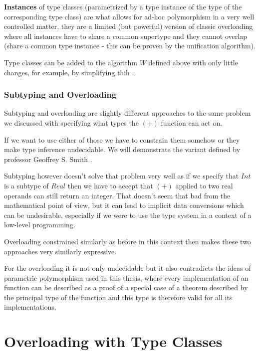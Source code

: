 \textbf{Instances} of type classes (parametrized by a type instance of the type of the corresponding type class) are what allows for ad-hoc polymorphism %
in a very well controlled matter, they are a limited (but powerful) version of classic overloading where all instances have to share a common supertype and they cannot overlap (share a common type instance - this can be proven by the unification algorithm).

Type classes can be added to the algorithm $W$ defined above with only little changes, for example, by simplifying thih \cite{jones1999typing}.

\subsubsection{Subtyping and Overloading}


Subtyping and overloading are slightly different approaches to the same problem we discussed with specifying what types the $(+)$ function can act on.

If we want to use either of those we have to constrain them somehow or they make type inference undecidable. We will demonstrate the variant defined by professor Geoffrey S. Smith \cite{smith1993polymorphic}.

Subtyping however doesn't solve that problem very well as if we specify that $Int$ is a subtype of $Real$ then we have to accept that $(+)$ applied to two real operands can still return an integer. That doesn't seem that bad from the mathematical point of view, but it can lead to implicit data conversions which can be undesirable, especially if we were to use the type system in a context of a low-level programming. %

Overloading constrained similarly as before in this context then makes these two approaches very similarly expressive. %

For the overloading it is not only undecidable but it also contradicts the ideas of parametric polymorphism used in this thesis, where every implementation of an function can be described as a proof of a special case of a theorem described by the principal type of the function and this type is therefore valid for all its implementations. %

\section{Overloading with Type Classes}

